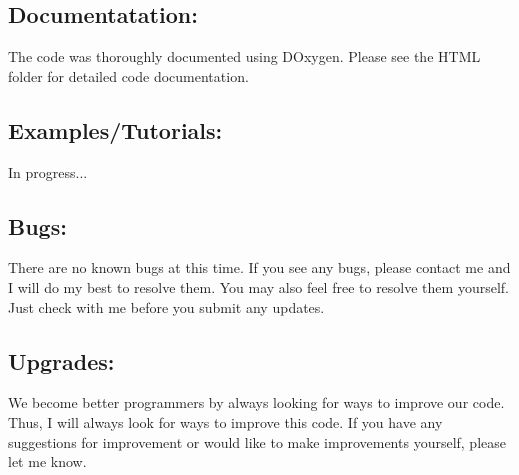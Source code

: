 \subsection*{Documentatation\+:}

The code was thoroughly documented using D\+Oxygen. Please see the H\+T\+M\+L folder for detailed code documentation.

\subsection*{Examples/\+Tutorials\+:}

In progress...

\subsection*{Bugs\+:}

There are no known bugs at this time. If you see any bugs, please contact me and I will do my best to resolve them. You may also feel free to resolve them yourself. Just check with me before you submit any updates.

\subsection*{Upgrades\+:}

We become better programmers by always looking for ways to improve our code. Thus, I will always look for ways to improve this code. If you have any suggestions for improvement or would like to make improvements yourself, please let me know. 